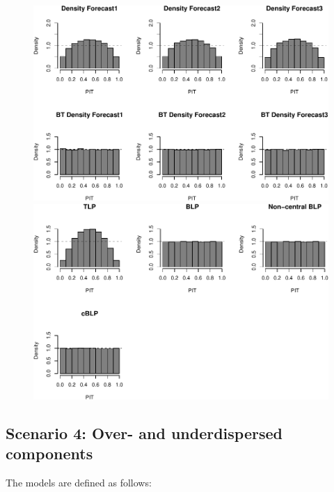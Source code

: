 \documentclass[]{article}
\begin{document}
\clearpage

\begin{figure}[H]

{\centering \includegraphics{Newest_BLPsim_new_files/figure-latex/unnamed-chunk-12-1} \includegraphics{Newest_BLPsim_new_files/figure-latex/unnamed-chunk-12-2} 

}

\end{figure}

\clearpage

\hypertarget{scenario-4-over--and-underdispersed-components}{%
\subsection{Scenario 4: Over- and underdispersed
components}\label{scenario-4-over--and-underdispersed-components}}

The models are defined as follows:
\end{document}

